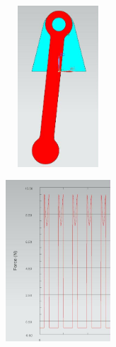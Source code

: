 \documentclass[12pt]{article}
\begin{document}
{\begin{figure}[H]
		\begin{subfigure}{0.49\textwidth}
			\centering\includegraphics[height=6cm,width=1\textwidth,keepaspectratio]{var6_2.jpeg}
			\caption{}
			\label{fig:var6_2.jpeg}
		\end{subfigure}
		\begin{subfigure}{0.49\textwidth}
			\centering\includegraphics[height=6cm,width=1\textwidth,keepaspectratio]{var6_3.jpeg}
			\caption{}
			\label{fig:var6_3.jpeg}
		\end{subfigure}
	\end{figure}
}
\end{document}
